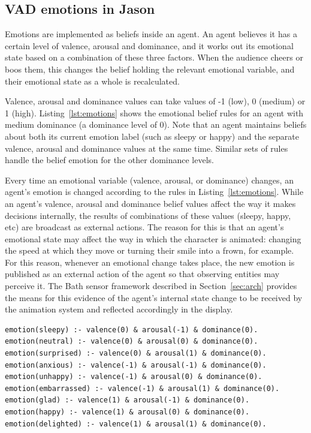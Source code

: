 \documentclass[11pt]{report}
\def\jnote#1{\todo[color=CornflowerBlue,size=\scriptsize]{Julian: #1}}
\begin{document}
\subsection{VAD emotions in Jason}
Emotions are implemented as beliefs inside an agent. An agent believes it has a certain level of valence, arousal and dominance, and it works out its emotional state based on a combination of these three factors. When the audience cheers or boos them, this changes the belief holding the relevant emotional variable, and their emotional state as a whole is recalculated.

Valence, arousal and dominance values can take values of -1 (low), 0 (medium) or 1 (high). Listing~\ref{lst:emotions} shows the emotional belief rules for an agent with medium dominance (a dominance level of 0). Note that an agent maintains beliefs about both its current emotion label (such as sleepy or happy) and the separate valence, arousal and dominance values at the same time.  Similar sets of rules handle the belief emotion for the other dominance levels.  %

Every time an emotional variable (valence, arousal, or dominance) changes, an agent's emotion is changed according to the rules in Listing~\ref{lst:emotions}. While an agent's valence, arousal and dominance belief values affect the way it makes decisions internally, the results of combinations of these values (sleepy, happy, etc) are broadcast as external actions. The reason for this is that an agent's emotional state may affect the way in which the character is animated: changing the speed at which they move or turning their smile into a frown, for example. For this reason, whenever an emotional change takes place, the new emotion is published as an external action of the agent so that observing entities may perceive it. The Bath sensor framework described in Section~\ref{sec:arch} provides the means for this evidence of the agent's internal state change to be received by the animation system and reflected accordingly in the display.

\begin{lstlisting}[float=!t,caption={Emotional rules for a character with medium dominance},label=lst:emotions,escapechar=\%,basicstyle=\scriptsize\ttfamily]
emotion(sleepy) :- valence(0) & arousal(-1) & dominance(0).
emotion(neutral) :- valence(0) & arousal(0) & dominance(0).
emotion(surprised) :- valence(0) & arousal(1) & dominance(0).
emotion(anxious) :- valence(-1) & arousal(-1) & dominance(0).
emotion(unhappy) :- valence(-1) & arousal(0) & dominance(0).
emotion(embarrassed) :- valence(-1) & arousal(1) & dominance(0).
emotion(glad) :- valence(1) & arousal(-1) & dominance(0).
emotion(happy) :- valence(1) & arousal(0) & dominance(0).
emotion(delighted) :- valence(1) & arousal(1) & dominance(0).
\end{lstlisting}
\end{document}
